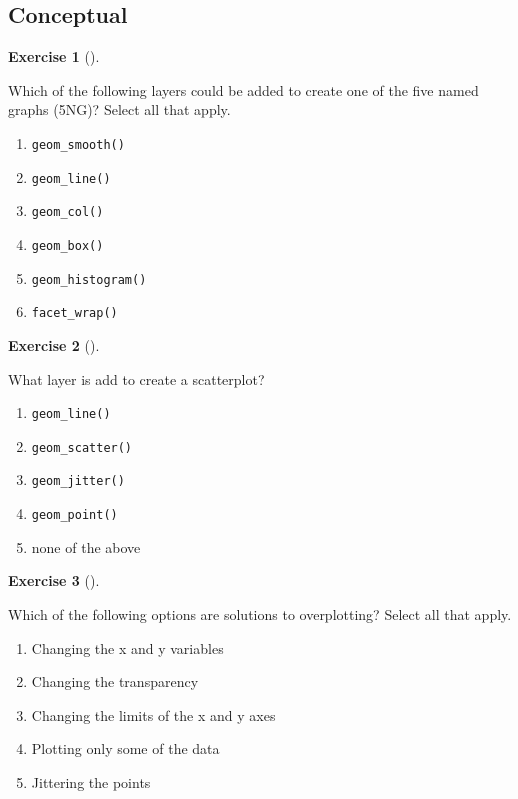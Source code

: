 \documentclass[
  letterpaper,
  DIV=11,
  numbers=noendperiod]{scrreprt}
\providecommand{\tightlist}{%
  \setlength{\itemsep}{0pt}\setlength{\parskip}{0pt}}\usepackage{longtable,booktabs,array}
\theoremstyle{definition}
\newtheorem{exercise}{Exercise}[chapter]
\theoremstyle{remark}
\begin{document}
\hypertarget{sec-ex02-conceptual}{%
\subsection{Conceptual}\label{sec-ex02-conceptual}}

\leavevmode{}%
\begin{exercise}[]\label{exr-ch02-c01}

Which of the following layers could be added to create one of the five
named graphs (5NG)? Select all that apply.

\begin{enumerate}
\def\labelenumi{\alph{enumi})}
\tightlist
\item
  \texttt{geom\_smooth()}
\item
  \texttt{geom\_line()}
\item
  \texttt{geom\_col()}
\item
  \texttt{geom\_box()}
\item
  \texttt{geom\_histogram()}
\item
  \texttt{facet\_wrap()}
\end{enumerate}

\end{exercise}

\leavevmode{}%
\begin{exercise}[]\label{exr-ch02-c02}

What layer is add to create a scatterplot?

\begin{enumerate}
\def\labelenumi{\alph{enumi})}
\tightlist
\item
  \texttt{geom\_line()}
\item
  \texttt{geom\_scatter()}
\item
  \texttt{geom\_jitter()}
\item
  \texttt{geom\_point()}
\item
  none of the above
\end{enumerate}

\end{exercise}

\leavevmode{}%
\begin{exercise}[]\label{exr-ch02-c03}

Which of the following options are solutions to overplotting? Select all
that apply.

\begin{enumerate}
\def\labelenumi{\alph{enumi})}
\tightlist
\item
  Changing the x and y variables
\item
  Changing the transparency
\item
  Changing the limits of the x and y axes
\item
  Plotting only some of the data
\item
  Jittering the points
\end{enumerate}

\end{exercise}
\end{document}
